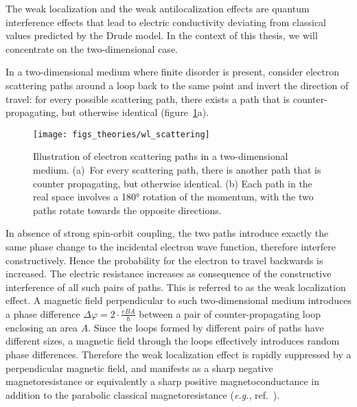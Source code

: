 The weak localization and the weak antilocalization effects are quantum interference effects that lead to electric conductivity deviating from classical values predicted by the Drude model. In the context of this thesis, we will concentrate on the two-dimensional case.

In a two-dimensional medium where finite disorder is present, consider electron scattering paths around a loop back to the same point and invert the direction of travel: for every possible scattering path, there exists a path that is counter-propagating, but otherwise identical (figure~\ref{fig:bg_scattering}a).%
\begin{figure}[ht]%
    \centering%
    \texttt{[image: figs\_theories/wl\_scattering]}%
    \caption[Electron scattering paths in two-dimensions.]{\label{fig:bg_scattering}Illustration of electron scattering paths in a two-dimensional medium. (a)~For every scattering path, there is another path that is counter propagating, but otherwise identical. (b) Each path in the real space involves a \ang{180} rotation of the momentum, with the two paths rotate towards the opposite directions.}%
\end{figure}%

In absence of strong spin-orbit coupling, the two paths introduce exactly the same phase change to the incidental electron wave function, therefore interfere constructively. Hence the probability for the electron to travel backwards is increased. The electric resistance increases as consequence of the constructive interference of all such pairs of paths. This is referred to as the weak localization effect. A magnetic field perpendicular to such two-dimensional medium introduces a phase difference $\Delta\varphi = 2\cdot\frac{eBA}{\hbar}$ between a pair of counter-propagating loop enclosing an area $A$. Since the loops formed by different pairs of paths have different sizes, a magnetic field through the loops effectively introduces random phase differences. Therefore the weak localization effect is rapidly suppressed by a perpendicular magnetic field, and manifests as a sharp negative magnetoresistance or equivalently a sharp positive magnetoconductance in addition to the parabolic classical magnetoresistance (\textit{e.g.}, ref.~\cite{bishop1982}).


